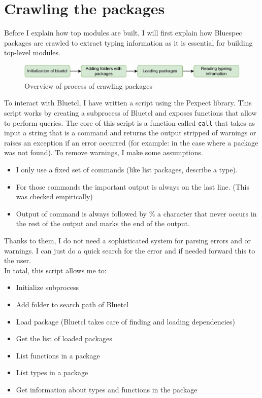 \documentclass[12pt]{report}
\begin{document}
\section{Crawling the packages}
Before I explain how top modules are built, I will first explain how Bluespec packages are crawled to extract typing information as it is essential for building top-level modules. 
\begin{figure}[!h]
    \centering
    \caption{Overview of process of crawling packages}

    \includegraphics[width=1.0\columnwidth]{pdfExports/LargeMap-Crawling.drawio.pdf}
\end{figure}
To interact with Bluetcl, I have written a script using the Pexpect library. This script works by creating a subprocess of Bluetcl and exposes functions that allow to perform queries. The core of this script is a function called \verb!call! that takes as input a string that is a command and returns the output stripped of warnings or raises an exception if an error occurred (for example: in the case where a package was not found). To remove warnings, I make some assumptions. 
\begin{itemize}
    \item I only use a fixed set of commands (like list packages, describe a type).  
    \item For those commands the important output is always on the last line. (This was checked empirically)   
    \item Output of command is always followed by $\%$ a character that never occurs in the rest of the output and marks the end of the output.  
\end{itemize}   
Thanks to them, I do not need a sophisticated system for parsing errors and or warnings. I can just do a quick search for the error and if needed forward this to the user.  
  \\   
In total, this script allows me to:   
\begin{itemize}   
\item Initialize subprocess   
\item Add folder to search path of Bluetcl   
\item Load package (Bluetcl takes care of finding and loading dependencies)   
\item Get the list of loaded packages   
\item List functions in a package   
\item List types in a package   
\item Get information about types and functions in the package   
\end{itemize} 
\end{document}
